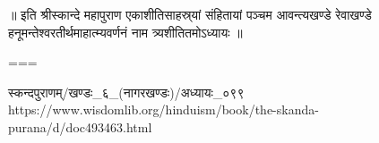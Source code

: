 

॥ इति श्रीस्कान्दे महापुराण एकाशीतिसाहस्र्यां संहितायां पञ्चम आवन्त्यखण्डे रेवाखण्डे हनूमन्तेश्वरतीर्थमाहात्म्यवर्णनं नाम त्र्यशीतितमोऽध्यायः ॥


===

स्कन्दपुराणम्/खण्डः_६_(नागरखण्डः)/अध्यायः_०९९
https://www.wisdomlib.org/hinduism/book/the-skanda-purana/d/doc493463.html

